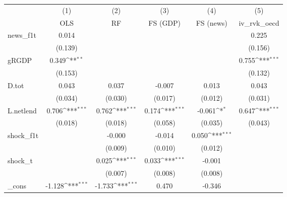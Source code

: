 {
\def\sym#1{\ifmmode^{#1}\else\(^{#1}\)\fi}
\begin{tabular}{l*{5}{c}}
\toprule
            &\multicolumn{1}{c}{(1)}&\multicolumn{1}{c}{(2)}&\multicolumn{1}{c}{(3)}&\multicolumn{1}{c}{(4)}&\multicolumn{1}{c}{(5)}\\
            &\multicolumn{1}{c}{OLS}&\multicolumn{1}{c}{RF}&\multicolumn{1}{c}{FS (GDP)}&\multicolumn{1}{c}{FS (news)}&\multicolumn{1}{c}{iv\_rvk\_oecd}\\
\midrule
news\_f1t    &       0.014         &                     &                     &                     &       0.225         \\
            &     (0.139)         &                     &                     &                     &     (0.156)         \\
\addlinespace
gRGDP       &       0.349\sym{**} &                     &                     &                     &       0.755\sym{***}\\
            &     (0.153)         &                     &                     &                     &     (0.132)         \\
\addlinespace
D.tot       &       0.043         &       0.037         &      -0.007         &       0.013         &       0.043         \\
            &     (0.034)         &     (0.030)         &     (0.017)         &     (0.012)         &     (0.031)         \\
\addlinespace
L.netlend   &       0.706\sym{***}&       0.762\sym{***}&       0.174\sym{***}&      -0.061\sym{*}  &       0.647\sym{***}\\
            &     (0.018)         &     (0.018)         &     (0.058)         &     (0.035)         &     (0.043)         \\
\addlinespace
shock\_f1t   &                     &      -0.000         &      -0.014         &       0.050\sym{***}&                     \\
            &                     &     (0.009)         &     (0.010)         &     (0.012)         &                     \\
\addlinespace
shock\_t     &                     &       0.025\sym{***}&       0.033\sym{***}&      -0.001         &                     \\
            &                     &     (0.007)         &     (0.008)         &     (0.008)         &                     \\
\addlinespace
\_cons      &      -1.128\sym{***}&      -1.733\sym{***}&       0.470         &      -0.346         &                     \\

\end{tabular}}
